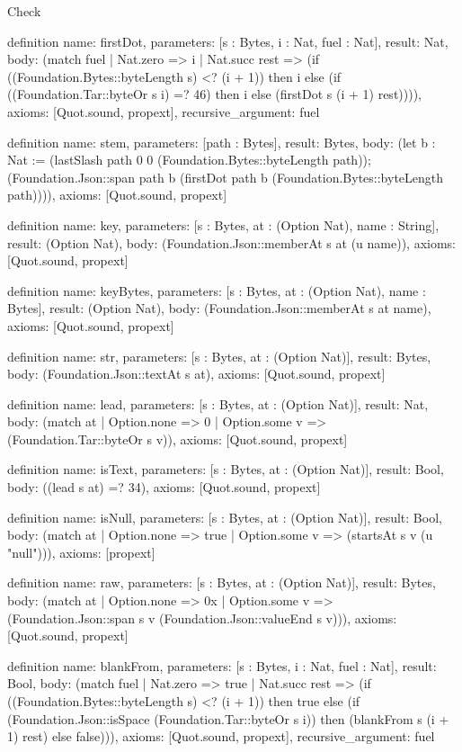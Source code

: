\begin{lexlean}{Check}
\begin{semanticmodule}
definition{
  name: firstDot,
  parameters: [s : Bytes, i : Nat, fuel : Nat],
  result: Nat,
  body: (match fuel
    | Nat.zero => i
    | Nat.succ rest => (if ((Foundation.Bytes::byteLength s) <? (i + 1)) then i else (if ((Foundation.Tar::byteOr s i) =? 46) then i else (firstDot s (i + 1) rest)))),
  axioms: [Quot.sound, propext],
  recursive_argument: fuel
}

definition{
  name: stem,
  parameters: [path : Bytes],
  result: Bytes,
  body: (let b : Nat := (lastSlash path 0 0 (Foundation.Bytes::byteLength path)); (Foundation.Json::span path b (firstDot path b (Foundation.Bytes::byteLength path)))),
  axioms: [Quot.sound, propext]
}

definition{
  name: key,
  parameters: [s : Bytes, at : (Option Nat), name : String],
  result: (Option Nat),
  body: (Foundation.Json::memberAt s at (u name)),
  axioms: [Quot.sound, propext]
}

definition{
  name: keyBytes,
  parameters: [s : Bytes, at : (Option Nat), name : Bytes],
  result: (Option Nat),
  body: (Foundation.Json::memberAt s at name),
  axioms: [Quot.sound, propext]
}

definition{
  name: str,
  parameters: [s : Bytes, at : (Option Nat)],
  result: Bytes,
  body: (Foundation.Json::textAt s at),
  axioms: [Quot.sound, propext]
}

definition{
  name: lead,
  parameters: [s : Bytes, at : (Option Nat)],
  result: Nat,
  body: (match at | Option.none => 0 | Option.some v => (Foundation.Tar::byteOr s v)),
  axioms: [Quot.sound, propext]
}

definition{
  name: isText,
  parameters: [s : Bytes, at : (Option Nat)],
  result: Bool,
  body: ((lead s at) =? 34),
  axioms: [Quot.sound, propext]
}

definition{
  name: isNull,
  parameters: [s : Bytes, at : (Option Nat)],
  result: Bool,
  body: (match at | Option.none => true | Option.some v => (startsAt s v (u "null"))),
  axioms: [propext]
}

definition{
  name: raw,
  parameters: [s : Bytes, at : (Option Nat)],
  result: Bytes,
  body: (match at
    | Option.none => 0x
    | Option.some v => (Foundation.Json::span s v (Foundation.Json::valueEnd s v))),
  axioms: [Quot.sound, propext]
}

definition{
  name: blankFrom,
  parameters: [s : Bytes, i : Nat, fuel : Nat],
  result: Bool,
  body: (match fuel
    | Nat.zero => true
    | Nat.succ rest => (if ((Foundation.Bytes::byteLength s) <? (i + 1)) then true else (if (Foundation.Json::isSpace (Foundation.Tar::byteOr s i)) then (blankFrom s (i + 1) rest) else false))),
  axioms: [Quot.sound, propext],
  recursive_argument: fuel
}


\end{semanticmodule}
\end{lexlean}
